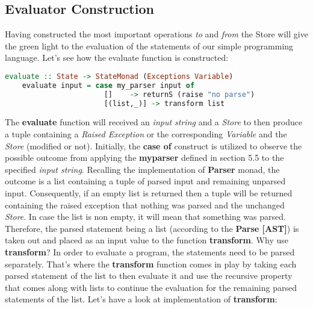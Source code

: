 \documentclass[a4paper, onecolumn]{article}
\begin{document}
    
    \subsection{Evaluator Construction}
    
    Having constructed the most important operations \textit{to} and \textit{from} the Store will give the green light to the evaluation of the statements of our simple programming language. Let's see how the evaluate function is constructed: 
    
    \begin{tcolorbox}
    \begin{lstlisting}[language=Haskell] 
    evaluate :: State -> StateMonad (Exceptions Variable)
    evaluate input = case my_parser input of
                       []    -> returnS (raise "no parse") 
                       [(list,_)] -> transform list
    \end{lstlisting}
    \end{tcolorbox}
    
    \noindent The \textbf{evaluate} function will received an \textit{input string} and a \textit{Store} to then produce a tuple containing a \textit{Raised Exception} or the corresponding \textit{Variable} and the \textit{Store} (modified or not). Initially, the \textbf{case of} construct is utilized to observe the possible outcome from applying the \textbf{my\textunderscore parser} defined in section 5.5 to the specified \textit{input string}. Recalling the implementation of \textbf{Parser} monad, the outcome is a list containing a tuple of parsed input and remaining unparsed input. Consequently, if an empty list is returned then a tuple will be returned containing the raised exception that nothing was parsed and the unchanged \textit{Store}. In case the list is non empty, it will mean that something was parsed. Therefore, the parsed statement being a list (according to the \textbf{Parse [AST]}) is taken out and placed as an input value to the function \textbf{transform}. Why use \textbf{transform}? In order to evaluate a program, the statements need to be parsed separately. That's where the \textbf{transform} function comes in play by taking each parsed statement of the list to then evaluate it and use the recursive property that comes along with lists to continue the evaluation for the remaining parsed statements of the list. Let's have a look at implementation of \textbf{transform}:
    
\end{document}
